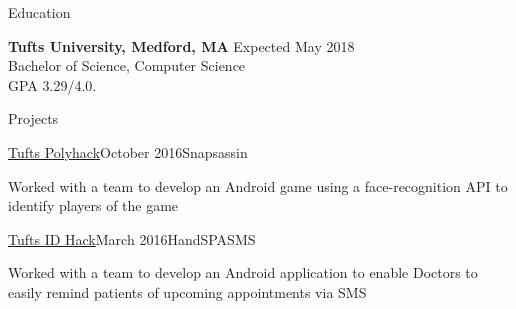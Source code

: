 \documentclass{resume} %
\begin{document}

\begin{rSection}{Education}

{\bf Tufts University, Medford, MA} \hfill {Expected May 2018} \\
Bachelor of Science, Computer Science \\
GPA 3.29/4.0.

\bigskip
\end{rSection}


\begin{rSection}{Projects}

\begin{rSubsection}{\href{http://2016.polyhack.tufts.io/}{Tufts Polyhack}}{October 2016}{Snapsassin}
\item Worked with a team to develop an Android game using a face-recognition
    API to identify players of the game
\end{rSubsection}

\begin{rSubsection}{\href{https://idhack16.devpost.com/}{Tufts ID Hack}}{March 2016}{HandSPASMS}
\item Worked with a team to develop an Android application to enable Doctors
    to easily remind patients of upcoming appointments via SMS
\end{rSubsection}

\bigskip
\end{rSection}





\end{document}
